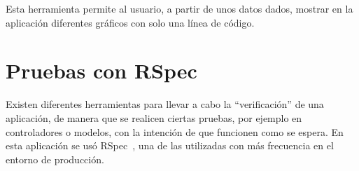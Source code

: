 Esta herramienta permite al usuario, a partir de unos datos dados, mostrar en la aplicación diferentes gráficos con solo una línea de código.


\section{Pruebas con RSpec}
\label{3:sec:6}

Existen diferentes herramientas para llevar a cabo la ``verificación'' de una aplicación, de manera que se realicen ciertas pruebas, por ejemplo en controladores o modelos, con la intención de que funcionen como se espera. En esta aplicación se usó RSpec~\cite{RSpec}, una de las utilizadas con más frecuencia en el entorno de producción.
